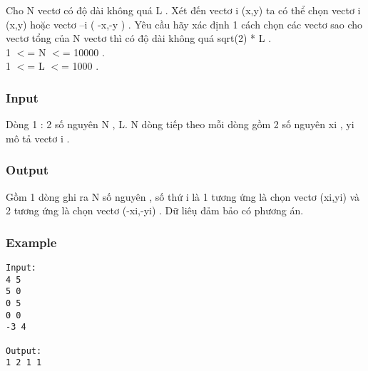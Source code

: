



   Cho N vectơ có độ dài không quá L . Xét đến vectơ i (x,y) ta có thể chọn vectơ i (x,y) hoặc vectơ –i ( -x,-y ) . Yêu cầu hãy xác định 1 cách chọn các vectơ sao cho vectơ tổng của N vectơ thì có độ dài không quá sqrt(2) * L .   
\\   1 $<$= N $<$= 10000 .   
\\   1 $<$= L $<$= 1000 .   
\\

\subsubsection{   Input  }

   Dòng 1 : 2 số nguyên N , L. N dòng tiếp theo mỗi dòng gồm 2 số nguyên xi , yi mô tả vectơ i .  

\subsubsection{   Output  }

   Gồm 1 dòng ghi ra N số nguyên , số thứ i là 1 tương ứng là chọn vectơ (xi,yi) và 2 tương ứng là chọn vectơ (-xi,-yi) . Dữ liêụ đảm bảo có phương án.  

\subsubsection{   Example  }
\begin{verbatim}
Input:
4 5
5 0
0 5
0 0
-3 4

Output:
1 2 1 1
\end{verbatim}